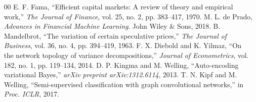 \documentclass[10pt,twocolumn,letterpaper]{article}
\begin{document}
\begin{thebibliography}{00}
 E. F. Fama, ``Efficient capital markets: A review of theory and empirical work,'' \textit{The Journal of Finance}, vol. 25, no. 2, pp. 383--417, 1970.
 M. L. de Prado, \textit{Advances in Financial Machine Learning}. John Wiley \& Sons, 2018.
 B. Mandelbrot, ``The variation of certain speculative prices,'' \textit{The Journal of Business}, vol. 36, no. 4, pp. 394--419, 1963.
 F. X. Diebold and K. Yilmaz, ``On the network topology of variance decompositions,'' \textit{Journal of Econometrics}, vol. 182, no. 1, pp. 119--134, 2014.
 D. P. Kingma and M. Welling, ``Auto-encoding variational Bayes,'' \textit{arXiv preprint arXiv:1312.6114}, 2013.
 T. N. Kipf and M. Welling, ``Semi-supervised classification with graph convolutional networks,'' in \textit{Proc. ICLR}, 2017.
\end{thebibliography}
\end{document}
